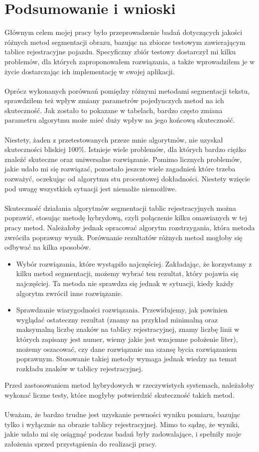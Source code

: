 \section{Podsumowanie i wnioski}
Głównym celem mojej pracy było przeprowadzenie badań dotyczących jakości różnych metod segmentacji obrazu, bazując na zbiorze testowym zawierającym tablice rejestracyjne pojazdu. Specyficzny zbiór testowy dostarczył mi kilku problemów, dla których zaproponowałem rozwiązania, a także wprowadziłem je w życie dostarczając ich implementację w swojej aplikacji.
\paragraph{}
Oprócz wykonanych porównań pomiędzy różnymi metodami segmentacji tekstu, sprawdziłem też wpływ zmiany parametrów pojedynczych metod na ich skuteczność. Jak zostało to pokazane w tabelach, bardzo często zmiana parametru algorytmu może mieć duży wpływ na jego końcową skuteczność.
\paragraph{}
Niestety, żaden z przetestowanych przeze mnie algorytmów, nie uzyskał skuteczności bliskiej 100\%. Istnieje wiele problemów, dla których bardzo ciężko znaleźć skuteczne oraz uniwersalne rozwiązanie. Pomimo licznych problemów, jakie udało mi się rozwiązać, pozostało jeszcze wiele zagadnień które trzeba rozważyć, oczekując od algorytmu stu procentowej dokładności. Niestety wzięcie pod uwagę wszystkich sytuacji jest niemalże niemożliwe.
\paragraph{}
Skuteczność działania algorytmów segmentacji tablic rejestracyjnych można poprawić, stosując metodę hybrydową, czyli połączenie kilku omawianych w tej pracy metod. Należałoby jednak opracować algorytm rozstrzygania, która metoda zwróciła poprawny wynik. Porównanie rezultatów różnych metod mogłoby się odbywać na kilka sposobów.
\begin{itemize}
  \item Wybór rozwiązania, które wystąpiło najczęściej. Zakładając, że korzystamy z kilku metod segmentacji, możemy wybrać ten rezultat, który pojawia się najczęściej. Ta metoda nie sprawdza się jednak w sytuacji, kiedy każdy algorytm zwrócił inne rozwiązanie.
    \item Sprawdzanie wiarygodności rozwiązania. Przewidujemy, jak powinien wyglądać ostateczny rezultat (znamy na przykład minimalną oraz maksymalną liczbę znaków na tablicy rejestracyjnej, znamy liczbę linii w których zapisany jest numer, wiemy jakie jest wzajemne położenie liter), możemy oszacować, czy dane rozwiązanie ma szansę bycia rozwiązaniem poprawnym. Stosowanie takiej metody wymaga jednak wiedzy na temat rozkładu znaków w tablicy rejestracyjnej.
\end{itemize}
Przed zastosowaniem metod hybrydowych w rzeczywistych systemach, należałoby wykonać liczne testy, które mogłyby potwierdzić skuteczność takich metod.
\paragraph{}
Uważam, że bardzo trudne jest uzyskanie pewności wyniku pomiaru, bazując tylko i wyłącznie na obrazie tablicy rejestracyjnej. Mimo to sądzę, że wyniki, jakie udało mi się osiągnąć podczas badań były zadowalające, i spełniły moje założenia sprzed przystąpienia do realizacji pracy.
